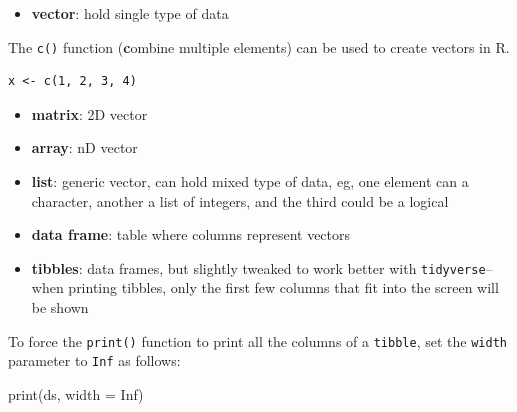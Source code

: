 \documentclass[
  letterpaper,
  DIV=11,
  numbers=noendperiod]{scrreprt}
\newenvironment{Shaded}{\begin{snugshade}}{\end{snugshade}}
\newcommand{\AttributeTok}[1]{\textcolor[rgb]{0.40,0.45,0.13}{#1}}
\newcommand{\ConstantTok}[1]{\textcolor[rgb]{0.56,0.35,0.01}{#1}}
\newcommand{\FunctionTok}[1]{\textcolor[rgb]{0.28,0.35,0.67}{#1}}
\newcommand{\NormalTok}[1]{\textcolor[rgb]{0.00,0.23,0.31}{#1}}
\providecommand{\tightlist}{%
  \setlength{\itemsep}{0pt}\setlength{\parskip}{0pt}}\usepackage{longtable,booktabs,array}
\begin{document}
\begin{itemize}
\tightlist
\item
  \textbf{vector}: hold single type of data
\end{itemize}

\begin{tcolorbox}[enhanced jigsaw, breakable, toprule=.15mm, titlerule=0mm, coltitle=black, colback=white, arc=.35mm, opacityback=0, left=2mm, colbacktitle=quarto-callout-note-color!10!white, toptitle=1mm, leftrule=.75mm, title=\textcolor{quarto-callout-note-color}{\faInfo}\hspace{0.5em}{Creating Vector}, bottomrule=.15mm, bottomtitle=1mm, rightrule=.15mm, opacitybacktitle=0.6, colframe=quarto-callout-note-color-frame]

The \texttt{c()} function (\textbf{c}ombine multiple elements) can be
used to create vectors in R.

\begin{verbatim}
x <- c(1, 2, 3, 4)
\end{verbatim}

\end{tcolorbox}

\begin{itemize}
\tightlist
\item
  \textbf{matrix}: 2D vector
\item
  \textbf{array}: nD vector
\item
  \textbf{list}: generic vector, can hold mixed type of data, eg, one
  element can a character, another a list of integers, and the third
  could be a logical
\item
  \textbf{data frame}: table where columns represent vectors
\item
  \textbf{tibbles}: data frames, but slightly tweaked to work better
  with \texttt{tidyverse}--when printing tibbles, only the first few
  columns that fit into the screen will be shown
\end{itemize}

\begin{tcolorbox}[enhanced jigsaw, breakable, toprule=.15mm, titlerule=0mm, coltitle=black, colback=white, arc=.35mm, opacityback=0, left=2mm, colbacktitle=quarto-callout-note-color!10!white, toptitle=1mm, leftrule=.75mm, title=\textcolor{quarto-callout-note-color}{\faInfo}\hspace{0.5em}{Printing tibble All Columns}, bottomrule=.15mm, bottomtitle=1mm, rightrule=.15mm, opacitybacktitle=0.6, colframe=quarto-callout-note-color-frame]

To force the \texttt{print()} function to print all the columns of a
\texttt{tibble}, set the \texttt{width} parameter to \texttt{Inf} as
follows:

\begin{Shaded}
\begin{Highlighting}[]
\FunctionTok{print}\NormalTok{(ds, }\AttributeTok{width =} \ConstantTok{Inf}\NormalTok{)}
\end{Highlighting}
\end{Shaded}

\end{tcolorbox}
\end{document}

